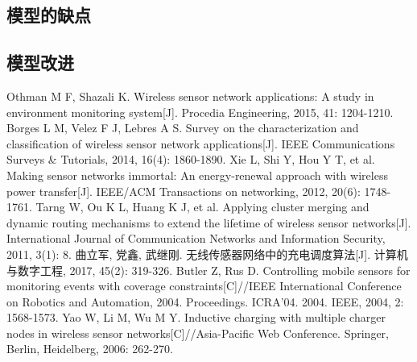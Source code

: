 \documentclass{whutmod}
\begin{document}
		\subsection{模型的缺点}

  		\subsection{模型改进}

  
  
 
	\newpage	%
	\nocite{*}		%
	\begin{thebibliography}{9}%
		Othman M F, Shazali K. Wireless sensor network applications: A study in environment monitoring system[J]. Procedia Engineering, 2015, 41: 1204-1210.
		Borges L M, Velez F J, Lebres A S. Survey on the characterization and classification of wireless sensor network applications[J]. IEEE Communications Surveys \& Tutorials, 2014, 16(4): 1860-1890.
		Xie L, Shi Y, Hou Y T, et al. Making sensor networks immortal: An energy-renewal approach with wireless power transfer[J]. IEEE/ACM Transactions on networking, 2012, 20(6): 1748-1761.
		Tarng W, Ou K L, Huang K J, et al. Applying cluster merging and dynamic routing mechanisms to extend the lifetime of wireless sensor networks[J]. International Journal of Communication Networks and Information Security, 2011, 3(1): 8.
		曲立军, 党鑫, 武继刚. 无线传感器网络中的充电调度算法[J]. 计算机与数字工程, 2017, 45(2): 319-326.
		Butler Z, Rus D. Controlling mobile sensors for monitoring events with coverage constraints[C]//IEEE International Conference on Robotics and Automation, 2004. Proceedings. ICRA'04. 2004. IEEE, 2004, 2: 1568-1573.
		Yao W, Li M, Wu M Y. Inductive charging with multiple charger nodes in wireless sensor networks[C]//Asia-Pacific Web Conference. Springer, Berlin, Heidelberg, 2006: 262-270.
	
	\end{thebibliography}
%
%			
%			
\end{document}
